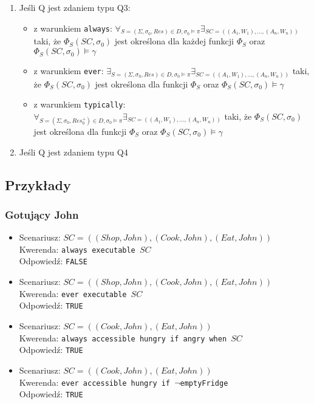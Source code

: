 \documentclass{article}
\begin{document}
\begin{enumerate}
	\item Jeśli Q jest zdaniem typu Q3:
	\begin{itemize}
		\item z warunkiem \texttt{always}: 
		$\forall_{S=(\Sigma, \sigma_{0}, Res) \in D, \sigma_{0} \models \pi} \exists_{SC=((A_{1}, W_{1}), \dots, (A_{n}, W_{n}))}$ taki, że $\Phi_{S}(SC, \sigma_{0})$ jest określona dla każdej funkcji $\Phi_{S}$ oraz $\Phi_{S}(SC, \sigma_{0}) \models \gamma$
		\item z warunkiem \texttt{ever}:
		$\exists_{S=(\Sigma, \sigma_{0}, Res) \in D, \sigma_{0} \models \pi} \exists_{SC=((A_{1}, W_{1}), \dots, (A_{n}, W_{n}))}$ taki, że $\Phi_{S}(SC, \sigma_{0})$ jest określona dla funkcji $\Phi_{S}$ oraz $\Phi_{S}(SC, \sigma_{0}) \models \gamma$
		\item z warunkiem \texttt{typically}:
		$\forall_{S=(\Sigma, \sigma_{0}, Res_{0}^{+}) \in D, \sigma_{0} \models \pi} \exists_{SC=((A_{1}, W_{1}), \dots, (A_{n}, W_{n}))}$ taki, że $\Phi_{S}(SC, \sigma_{0})$ jest określona dla funkcji $\Phi_{S}$ oraz $\Phi_{S}(SC, \sigma_{0}) \models \gamma$
	\end{itemize}
	\item Jeśli Q jest zdaniem typu Q4
\end{enumerate} 


\subsection{Przykłady}
\subsubsection{Gotujący John}
\begin{itemize}
\item
Scenariusz: $SC=((Shop,John),(Cook,John),(Eat,John))$\\
Kwerenda: {\large\texttt{always executable $SC$}}\\
Odpowiedź: \texttt{FALSE}
\item
Scenariusz: $SC=((Shop,John),(Cook,John),(Eat,John))$\\
Kwerenda: {\large\texttt{ever executable $SC$}}\\
Odpowiedź: \texttt{TRUE}

\item
Scenariusz: $SC=((Cook,John),(Eat,John))$\\
Kwerenda: {\large\texttt{always accessible hungry if angry when $SC$}}\\
Odpowiedź: \texttt{TRUE}

\item
Scenariusz: $SC=((Cook,John),(Eat,John))$\\
Kwerenda: {\large\texttt{ever accessible hungry if $\neg$emptyFridge}}\\
Odpowiedź: \texttt{TRUE}

\end{itemize}
\end{document}
